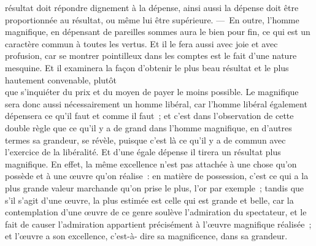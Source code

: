 \documentclass[french,twoside]{book} %
\begin{document}
résultat doit répondre dignement à la dépense, ainsi aussi la dépense doit être proportionnée au résultat, ou même lui être supérieure. — En outre, l’homme magnifique, en dépensant de pareilles sommes aura le bien pour fin, ce qui est un caractère commun à toutes les vertus. Et il le fera aussi avec joie et avec profusion, car se montrer pointilleux dans les comptes est le fait d’une nature mesquine. Et il examinera la façon d’obtenir le plus beau résultat et le plus hautement convenable, plutôt \\
que s’inquiéter du prix et du moyen de payer le moins possible. Le magnifique sera donc aussi nécessairement un homme libéral, car l’homme libéral également dépensera ce qu’il faut et comme il faut ; et c’est dans l’observation de cette double règle que ce qu’il y a de grand dans l’homme magnifique, en d’autres termes sa grandeur, se révèle, puisque c’est là ce qu’il y a de commun avec l’exercice de la libéralité. Et d’une égale dépense il tirera un résultat plus magnifique. En effet, la même excellence n’est pas attachée à une chose qu’on \\
possède et à une œuvre qu’on réalise : en matière de possession, c’est ce qui a la plus grande valeur marchande qu’on prise le plus, l’or par exemple ; tandis que s’il s’agit d’une œuvre, la plus estimée est celle qui est grande et belle, car la contemplation d’une œuvre de ce genre soulève l’admiration du spectateur, et le fait de causer l’admiration appartient précisément à l’œuvre magnifique réalisée ; et l’œuvre a son excellence, c’est-à- dire sa magnificence, dans sa grandeur.
\end{document}
